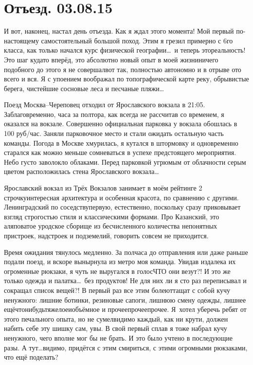 \chapter{Отъезд. 03.08.15}

И вот, наконец, настал день отъезда. Как я ждал этого момента! Мой первый по-настоящему самостоятельный большой поход. Этим я грезил примерно с 6\sdash го класса, как только начался курс физической географии\ldots~и теперь это\mdash реальность! Это шаг куда\sdash то вперёд, это абсолютно новый опыт в моей жизни\mdash ничего подобного до этого я не совершал\mdash вот так, полностью автономно и в отрыве ото всего и вся. Я с упоением воображал по топографической карте реку, обрывистые берега, чистейшие сосновые леса и песчаные пляжи\ldots 

Поезд Москва\nobreakdash--Череповец отходил от Ярославского вокзала в 21:05. Заблаговременно, часа за полтора, как всегда не рассчитав со временем, я оказался на вокзале. Совершенно официальная парковка у вокзала обошлась в 100 руб/час. Заняли парковочное место и стали ожидать остальную часть команды. Погода в Москве хмурилась, я кутался в штормовку и одновременно старался как можно меньше сомневаться в успехе предстоящего мероприятия. Небо густо заволокло облаками. Перед парковкой угрюмым от облачности серым цветом расположилась стена Ярославского вокзала\ldots

Ярославский вокзал из Трёх Вокзалов занимает в моём рейтинге 2 строчку\mdash интересная архитектура и особенная красота, по сравнению с другими. Ленинградский по соседству\mdash первую, естественно, поскольку сразу приковывает взгляд строгостью стиля и классическими формами. Про Казанский, это аляповатое уродское сборище из бесчисленного количества непонятных пристроек, надстроек и подземелий, говорить совсем не приходится.

Время ожидания тянулось медленно. За полчаса до отправления или даже раньше подали поезд, и вскоре вынырнула из метро моя команда. Увидав издалека их огроменные рюкзаки, я чуть не выругался в голос\mdash ЧТО они везут?! И это же только одежда и палатка\ldots~без продуктов! Не для них ли я сто раз переписывал и сокращал список вещей?! В первый раз все этим болеют\mdash тащат с собой кучу ненужного: лишние ботинки, резиновые сапоги, лишнюю смену одежды, лишнее ещё\sdash что\sdash нибудь\sdash тяжелое\sdash и\sdash объёмное и прочее\sdash прочее\sdash прочее. Я~хотел уберечь ребят от этого печального опыта, но не сумел\mdash видимо каждый, как ни крути, должен набить себе эту шишку сам, увы. В свой первый сплав я тоже набрал кучу ненужного, чего вполне мог бы не брать. И это было учтено в последующие разы. А тут\ldots видимо, придётся с этим смириться, с этими огромными рюкзаками, что ещё поделать?

